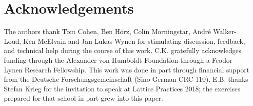 \section*{Acknowledgements}\label{sec:acknowledgements}

The authors thank
Tom Cohen,
Ben H\"{o}rz,
Colin Morningstar,
Andr\'{e} Walker-Loud,
Ken McElvain
and
Jan-Lukas Wynen
for stimulating discussion, feedback, and technical help during the course of this work.
C.K. gratefully acknowledges funding through the Alexander von Humboldt Foundation through a Feodor Lynen Research Fellowship.
This work was done in part through financial support from the Deutsche Forschungsgemeinschaft (Sino-German CRC 110).
E.B. thanks Stefan Krieg for the invitation to speak at Lattice Practices 2018\cite{lattice-practices}; the exercises\cite{lattice-practices-exercises} prepared for that school in part grew into this paper.


